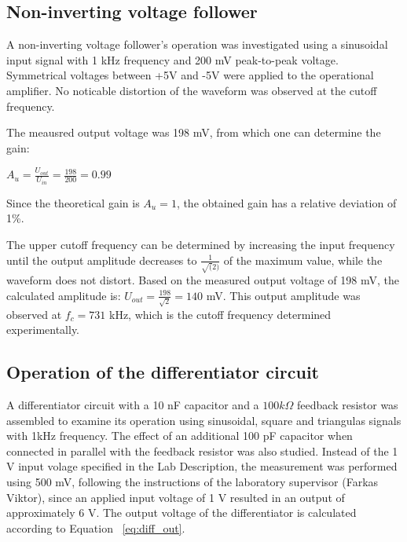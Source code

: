 \documentclass[12pt]{article}
\begin{document}
\subsection{Non-inverting voltage follower}

A non-inverting voltage follower's operation was investigated using a sinusoidal input signal with 1 kHz frequency and 200 mV peak-to-peak voltage. Symmetrical voltages between +5V and -5V were applied to the operational amplifier. No noticable distortion of the waveform was observed at the cutoff frequency.

The meausred output voltage was 198 mV, from which one can determine the gain:
\newline \begin{center} $A_{u}=\frac{U_{out}}{U_{in}}=\frac{198}{200}=0.99$ \end{center}

Since the theoretical gain is $A_{u}=1$, the obtained gain has a relative deviation of 1\%. 

The upper cutoff frequency can be determined by increasing the input frequency until the output amplitude decreases to $\frac{1}{\sqrt(2)}$ of the maximum value, while the waveform does not distort. Based on the measured output voltage of 198 mV, the calculated amplitude is:
\newline $U_{out}=\frac{198}{\sqrt{2}} = 140$ mV. This output amplitude was observed at $f_c = 731$ kHz, which is the cutoff frequency determined experimentally.


\subsection{Operation of the differentiator circuit}

A differentiator circuit with a 10 nF capacitor and a $100 k\Omega$ feedback resistor was assembled to examine its operation using sinusoidal, square and triangulas signals with 1kHz frequency. The effect of an additional 100 pF capacitor when connected in parallel with the feedback resistor was also studied. Instead of the 1 V input volage specified in the Lab Description, the measurement was performed using 500 mV, following the instructions of the laboratory supervisor (Farkas Viktor), since an applied input voltage of 1 V resulted in an output of approximately 6 V. 
The output voltage of the differentiator is calculated according to Equation ~\ref{eq:diff_out}. 
\end{document}

